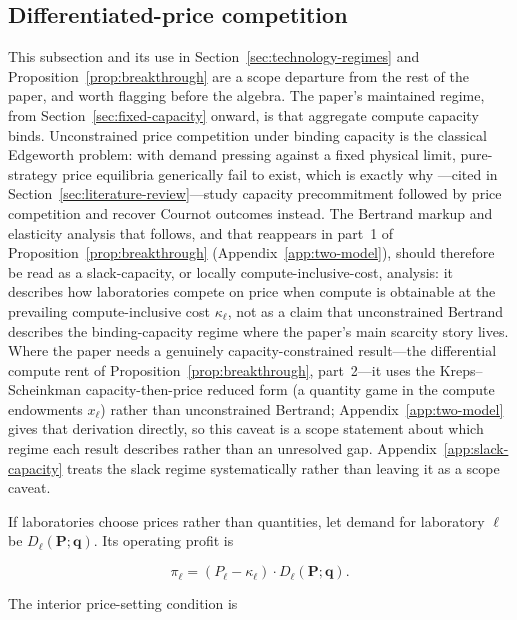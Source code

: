 \documentclass[11pt]{article}
\begin{document}
\subsection{Differentiated-price competition}
\label{subsec:price-competition}

This subsection and its use in Section~\ref{sec:technology-regimes} and Proposition~\ref{prop:breakthrough} are a scope departure from the rest of the paper, and worth flagging before the algebra. The paper's maintained regime, from Section~\ref{sec:fixed-capacity} onward, is that aggregate compute capacity binds. Unconstrained price competition under binding capacity is the classical Edgeworth problem: with demand pressing against a fixed physical limit, pure-strategy price equilibria generically fail to exist, which is exactly why \citet{krepsScheinkman1983}---cited in Section~\ref{sec:literature-review}---study capacity precommitment followed by price competition and recover Cournot outcomes instead. The Bertrand markup and elasticity analysis that follows, and that reappears in part~1 of Proposition~\ref{prop:breakthrough} (Appendix~\ref{app:two-model}), should therefore be read as a slack-capacity, or locally compute-inclusive-cost, analysis: it describes how laboratories compete on price when compute is obtainable at the prevailing compute-inclusive cost $\kappa_\ell$, not as a claim that unconstrained Bertrand describes the binding-capacity regime where the paper's main scarcity story lives. Where the paper needs a genuinely capacity-constrained result---the differential compute rent of Proposition~\ref{prop:breakthrough}, part~2---it uses the Kreps--Scheinkman capacity-then-price reduced form (a quantity game in the compute endowments $x_\ell$) rather than unconstrained Bertrand; Appendix~\ref{app:two-model} gives that derivation directly, so this caveat is a scope statement about which regime each result describes rather than an unresolved gap. Appendix~\ref{app:slack-capacity} treats the slack regime systematically rather than leaving it as a scope caveat.

If laboratories choose prices rather than quantities, let demand for laboratory $\ell$ be $D_\ell(\mathbf P;\mathbf q)$. Its operating profit is

\begin{equation}\pi_\ell=\left(P_\ell-\kappa_\ell\right)\cdot D_\ell(\mathbf P;\mathbf q).\end{equation}

The interior price-setting condition is
\end{document}
